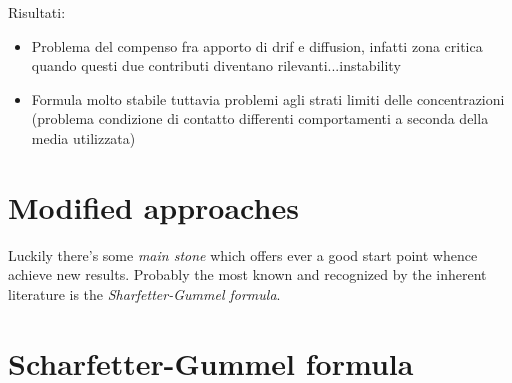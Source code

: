  
Risultati:
\begin{itemize}
\item Problema del compenso fra apporto di drif e diffusion, infatti zona critica quando questi due contributi diventano rilevanti...instability

\item Formula molto stabile tuttavia problemi agli strati limiti delle concentrazioni (problema condizione di contatto differenti comportamenti a seconda della media utilizzata)

\end{itemize}
 
 
\begin{figure}
\centering




\end{figure} 
 

 
\section{Modified approaches} 
 
 Luckily there's some \textit{main stone} which offers ever a good start point whence achieve new results. Probably the most known and recognized by the inherent literature is the \textit{Sharfetter-Gummel formula}.

\begin{figure}
\centering




\end{figure} 

\section{Scharfetter-Gummel formula}

